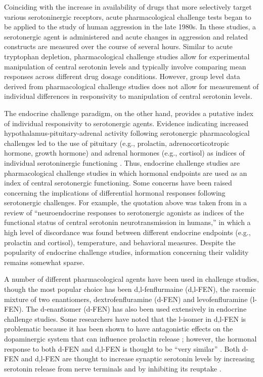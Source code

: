 \indent Coinciding with the increase in availability of drugs that more selectively target various serotoninergic receptors, acute pharmacological challenge tests began to be applied to the study of human aggression in the late 1980s. In these studies, a serotonergic agent is administered and acute changes in aggression and related constructs are measured over the course of several hours. Similar to acute tryptophan depletion, pharmacological challenge studies allow for experimental manipulation of central serotonin levels and typically involve comparing mean responses across different drug dosage conditions. However, group level data derived from pharmacological challenge studies does not allow for measurement of individual differences in responsivity to manipulation of central serotonin levels.


The endocrine challenge paradigm, on the other hand, provides a putative index of individual responsivity to serotonergic agents. Evidence indicating increased hypothalamus-pituitary-adrenal activity following serotonergic pharmacological challenges led to the use of pituitary (e.g., prolactin, adrenocorticotropic hormone, growth hormone) and adrenal hormones (e.g., cortisol) as indices of individual serotoninergic functioning \parencite{Cowen1990}. Thus, endocrine challenge studies are pharmacological challenge studies in which hormonal endpoints are used as an index of central serotonergic functioning. Some concerns have been raised concerning the implications of differential hormonal responses following serotonergic challenges. For example, the quotation above was taken from \citeauthor{Murphy1996} in a review of ``neuroendocrine responses to serotonergic agonists as indices of the functional status of central serotonin neurotransmission in humans,'' in which a high level of discordance was found between different endocrine endpoints (e.g., prolactin and cortisol), temperature, and behavioral measures. Despite the popularity of endocrine challenge studies, information concerning their validity remains somewhat sparse.

 
A number of different pharmacological agents have been used in challenge studies, though the most popular choice has been d,l-fenflurmaine (d,l-FEN), the racemic mixture of two enantiomers, dextrofenfluramine (d-FEN) and levofenfluramine (l-FEN). The d-enantiomer (d-FEN) has also been used extensively in endocrine challenge studies. Some researchers \parencite[e.g.,][]{Coccaro2010} have noted that the l-isomer in d,l-FEN is problematic because it has been shown to have antagonistic effects on the dopaminergic system that can influence prolactin release \parencite[see][]{Ben-Jonathan1989, Coccaro1994, Crunelli1980}; however, the hormonal response to both d-FEN and d,l-FEN is thought to be ``very similar'' \parencite[436]{Coccaro2010}. Both d-FEN and d,l-FEN are thought to increase synaptic serotonin levels by increasing serotonin release from nerve terminals and by inhibiting its reuptake \parencite{Pine1997}.


